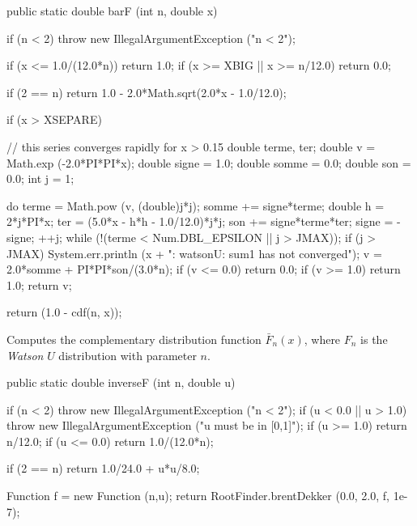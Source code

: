 \begin{code}

   public static double barF (int n, double x)\begin{hide} {
      if (n < 2)
         throw new IllegalArgumentException ("n < 2");

      if (x <= 1.0/(12.0*n))
         return 1.0;
      if (x >= XBIG || x >= n/12.0)
         return 0.0;

      if (2 == n)
         return 1.0 - 2.0*Math.sqrt(2.0*x - 1.0/12.0);

      if (x > XSEPARE) {
         // this series converges rapidly for x > 0.15
         double terme, ter;
         double v = Math.exp (-2.0*PI*PI*x);
         double signe = 1.0;
         double somme = 0.0;
         double son = 0.0;
         int j = 1;

         do {
            terme = Math.pow (v, (double)j*j);
            somme += signe*terme;
            double h = 2*j*PI*x;
            ter = (5.0*x - h*h - 1.0/12.0)*j*j;
            son += signe*terme*ter;
            signe = -signe;
            ++j;
         } while (!(terme < Num.DBL_EPSILON || j > JMAX));
         if (j > JMAX)
            System.err.println (x + ": watsonU:  sum1 has not converged");
         v = 2.0*somme + PI*PI*son/(3.0*n);
         if (v <= 0.0) 
            return 0.0;
         if (v >= 1.0)
            return 1.0;
         return v;
      }

      return (1.0 - cdf(n, x));
   }\end{hide}
\end{code}
\begin{tabb}
  Computes the complementary distribution function  $\bar F_n(x)$,
  where $F_n$ is the {\em Watson\/} $U$ distribution with parameter $n$.
\end{tabb}
\begin{code}

   public static double inverseF (int n, double u)\begin{hide} {
      if (n < 2)
         throw new IllegalArgumentException ("n < 2");
      if (u < 0.0 || u > 1.0)
         throw new IllegalArgumentException ("u must be in [0,1]");
      if (u >= 1.0)
         return n/12.0;
      if (u <= 0.0)
         return 1.0/(12.0*n);

      if (2 == n)
         return 1.0/24.0 + u*u/8.0;

      Function f = new Function (n,u);
      return RootFinder.brentDekker (0.0, 2.0, f, 1e-7);
   }\end{hide}
\end{code}
